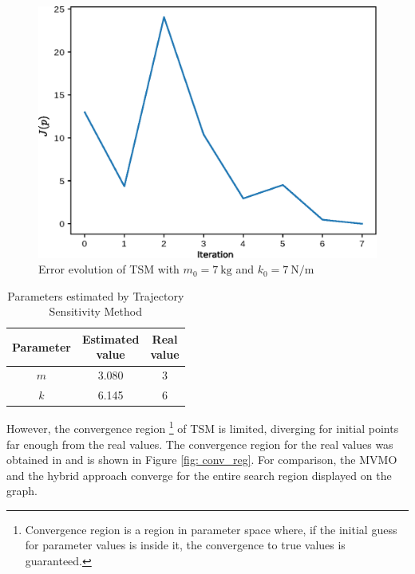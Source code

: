 \begin{figure}[h]
	\caption{Error evolution of TSM with $m_{0} = 7\ \text{kg}$ and $k_{0} = 7\ \text{N/m}$}
	\begin{center}
		\includegraphics[scale=0.6]{Images/TS_conv.eps}
	\end{center}
	\label{fig: TS_conv}
\end{figure}

\begin{table}[h]
	\caption{Parameters estimated by Trajectory Sensitivity Method}
	\begin{center}
		\begin{tabular}{c|c|c}
			Parameter & \shortstack{Estimated \\ value} & \shortstack{Real \\ value} \\
			\hline
			$m$ & 3.080 & 3 \\
			$k$ & 6.145 & 6 \\
		\end{tabular}
	\end{center}
	\label{tab: spring_mass_ts}
\end{table}

However, the convergence region \footnote{Convergence region is a region in parameter space where, if the initial guess for parameter values is inside it, the convergence to true values is guaranteed.} of TSM is limited, diverging for initial points far enough from the real values. The convergence region for the real values was obtained in \cite{Ecyo} and is shown in Figure \ref{fig: conv_reg}. For comparison, the MVMO and the hybrid approach converge for the entire search region displayed on the graph.

